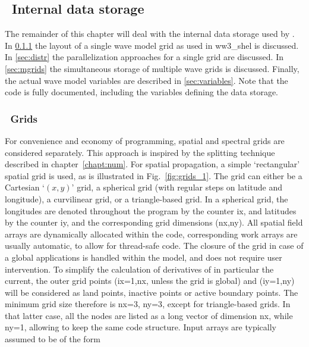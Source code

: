 \vssub
\subsection{~Internal data storage} \label{sec:common}
\vssub

The remainder of this chapter will deal with the internal data storage used by
\ws. In \para\ref{sec:grids} the layout of a single wave model grid as used in
{\file ww3\_shel} is discussed. In \para\ref{sec:distr} the parallelization
approaches for a single grid are discussed. In \para\ref{sec:mgrids} the
simultaneous storage of multiple wave grids is discussed. Finally, the actual
wave model variables are described in \para\ref{sec:variables}. Note that the
code is fully documented, including the variables defining the data storage.


\vsssub
\subsubsection{~Grids} \label{sec:grids}
\vsssub



For convenience and economy of programming, spatial and spectral grids are
considered separately. This approach is inspired by the splitting technique
described in chapter~\ref{chapt:num}. For spatial propagation, a simple
`rectangular' spatial grid is used, as is illustrated in
Fig.~\ref{fig:grids_1}. The grid can either be a Cartesian `$(x,y)$' grid, a
spherical grid (with regular steps on latitude and longitude), a curvilinear grid, 
or a triangle-based grid. In a spherical grid, the longitudes are denoted throughout the
program by the counter {\F ix}, and latitudes by the counter {\F iy}, and the
corresponding grid dimensions {\F (nx,ny)}. All spatial field arrays are
dynamically allocated within the code, corresponding work arrays are usually
automatic, to allow for thread-safe code. The closure of the grid in case of a
global applications is handled within the model, and does not require user
intervention. To simplify the calculation of derivatives of in particular the
current, the outer grid points ({\F ix=1,nx}, unless the grid is global) and
({\F iy=1,ny}) will be considered as land points, inactive points or active
boundary points. The minimum grid size therefore is {\F nx=3, ny=3}, except for 
triangle-based grids. In that latter case, all the nodes are listed as a long 
vector of dimension nx, while ny=1, allowing to keep the same code structure. Input
arrays are typically assumed to be of the form


